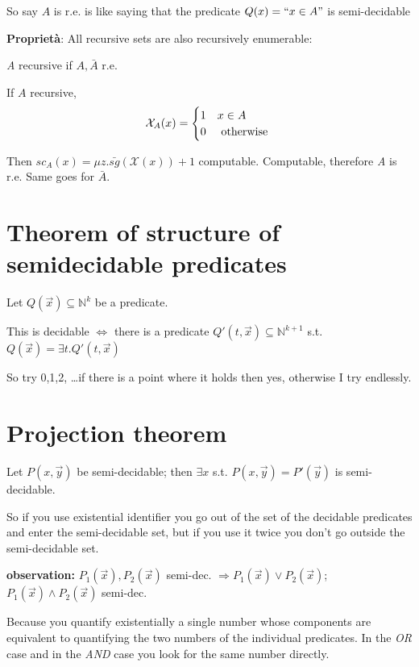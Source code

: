 \documentclass{amsbook}
\newcommand{\nat}{\ensuremath{\mathbb{N}}}
\theoremstyle{definition}
\theoremstyle{remark}
\numberwithin{section}{chapter}
\numberwithin{equation}{chapter}
\begin{document}
So say $A$ is r.e. is like saying that the predicate $ Q(x)=``x \in A" $ is semi-decidable

\textbf{Proprietà}: All recursive sets are also recursively enumerable:

\textit{A} recursive if $ A, \bar{A} $ r.e.

If $A$ recursive, \begin{equation*}
	\mathcal{X}_A(x)=\begin{cases}
		1 & x\in A        \\
		0 & $ otherwise $
	\end{cases}
\end{equation*}

Then $ sc_A(x) = \mu z.\bar{sg}(\mathcal{X}(x)) + 1 $ computable. Computable, therefore \textit{A} is r.e. Same goes for $ \bar{A} $.

\section {Theorem of structure of semidecidable predicates}

Let $ Q(\vec{x}) \subseteq \nat^k $ be a predicate.

This is decidable $ \Leftrightarrow $ there is a predicate $ Q'(t,\vec{x}) \subseteq \nat^{k+1} $ s.t. $ Q(\vec{x}) = \exists t. Q'(t,\vec{x}) $

So try 0,1,2, \dots if there is a point where it holds then yes, otherwise I try endlessly.

\section {Projection theorem}

Let $ P(x,\vec{y}) $ be semi-decidable; then $ \exists x $ s.t. $ P(x,\vec{y}) = P'(\vec{y})$ is semi-decidable.

So if you use existential identifier you go out of the set of the decidable predicates and enter the semi-decidable set, but if you use it twice you don't go outside the semi-decidable set.

\textbf{observation:} $ P_1(\vec{x}), P_2(\vec{x}) $ semi-dec. $ \Rightarrow P_1(\vec{x}) \lor P_2(\vec{x}) $; $ P_1(\vec{x}) \land P_2(\vec{x}) $ semi-dec.

Because you quantify existentially a single number whose components are equivalent to quantifying the two numbers of the individual predicates. In the \textit{OR} case and in the \textit{AND} case you look for the same number directly.
\end{document}
